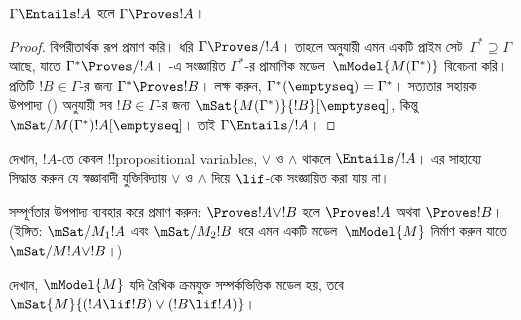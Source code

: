 \documentclass[../../../include/open-logic-section]{subfiles}
\begin{document}


\begin{thm}
  $\Gamma \Entails !A$ হলে $\Gamma \Proves !A$।
\end{thm}

\begin{proof}
  বিপরীতার্থক রূপ প্রমাণ করি। ধরি $\Gamma \Proves/ !A$।
  তাহলে  অনুযায়ী এমন একটি প্রাইম
  সেট~$\Gamma^* \supseteq \Gamma$ আছে, যাতে
  $\Gamma^* \Proves/ !A$। -এ
  সংজ্ঞায়িত $\Gamma^*$-র প্রামাণিক মডেল~$\mModel{M(\Gamma^*)}$
  বিবেচনা করি। প্রতিটি $!B \in \Gamma$-র জন্য
  $\Gamma^* \Proves !B$। লক্ষ করুন,
  $\Gamma^*(\emptyseq) = \Gamma^*$। সত্যতার সহায়ক উপপাদ্য
  () অনুযায়ী সব $!B \in \Gamma$-র জন্য
  $\mSat{M(\Gamma^*)}{!B}[\emptyseq]$, কিন্তু
  $\mSat/{M(\Gamma^*)}{!A}[\emptyseq]$। তাই
  $\Gamma \Entails/ !A$।
\end{proof}

\begin{prob}
  দেখান, $!A$-তে কেবল !!{propositional variable}s, $\lor$ ও
  $\land$ থাকলে $\Entails/ !A$। এর সাহায্যে সিদ্ধান্ত করুন যে
  স্বজ্ঞাবাদী যুক্তিবিদ্যায় $\lor$ ও $\land$ দিয়ে $\lif$-কে
  সংজ্ঞায়িত করা যায় না।
\end{prob}

\begin{prob}
  সম্পূর্ণতার উপপাদ্য ব্যবহার করে প্রমাণ করুন:
  $\Proves !A \lor !B$ হলে $\Proves !A$ অথবা $\Proves !B$।
  (ইঙ্গিত: $\mSat/{M_1}{!A}$ এবং $\mSat/{M_2}{!B}$ ধরে
  এমন একটি মডেল~$\mModel{M}$ নির্মাণ করুন যাতে
  $\mSat/{M}{!A \lor !B}$।)
\end{prob}

\begin{prob}
  দেখান, $\mModel{M}$ যদি রৈখিক ক্রমযুক্ত সম্পর্কভিত্তিক মডেল হয়,
  তবে $\mSat{M}{(!A \lif !B)\lor(!B \lif !A)}$।
\end{prob}
\end{document}
